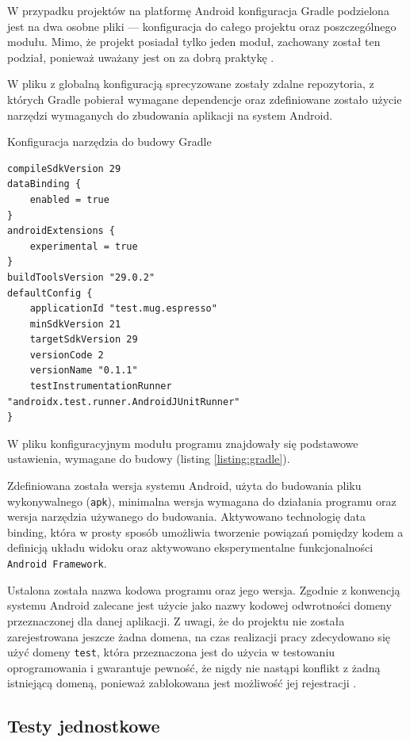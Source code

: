 \documentclass[polish,polish,a4paper,12pt]{article}
\begin{document}
	W przypadku projektów na platformę Android konfiguracja Gradle podzielona jest na dwa osobne pliki — konfiguracja do całego projektu oraz poszczególnego modułu. Mimo, że projekt posiadał tylko jeden moduł, zachowany został ten podział, ponieważ uważany jest on za dobrą praktykę \cite{kotlin}.

	W pliku z globalną konfiguracją sprecyzowane zostały zdalne repozytoria, z których Gradle pobierał wymagane dependencje oraz zdefiniowane zostało użycie narzędzi wymaganych do zbudowania aplikacji na system Android.

	\begin{listing}[H]
		\caption{Konfiguracja narzędzia do budowy Gradle}
		\begin{verbatim}
compileSdkVersion 29
dataBinding {
	enabled = true
}
androidExtensions {
	experimental = true
}
buildToolsVersion "29.0.2"
defaultConfig {
	applicationId "test.mug.espresso"
	minSdkVersion 21
	targetSdkVersion 29
	versionCode 2
	versionName "0.1.1"
	testInstrumentationRunner "androidx.test.runner.AndroidJUnitRunner"
}
		\end{verbatim}
		\label{listing:gradle}
	\end{listing}

	W pliku konfiguracyjnym modułu programu znajdowały się podstawowe ustawienia, wymagane do budowy (listing \ref{listing:gradle}).

	Zdefiniowana została wersja systemu Android, użyta do budowania pliku wykonywalnego (\texttt{apk}), minimalna wersja wymagana do działania programu oraz wersja narzędzia używanego do budowania. Aktywowano technologię data binding, która w prosty sposób umożliwia tworzenie powiązań pomiędzy kodem a definicją układu widoku oraz aktywowano eksperymentalne funkcjonalności \texttt{Android Framework}.

	Ustalona została nazwa kodowa programu oraz jego wersja. Zgodnie z konwencją systemu Android zalecane jest użycie jako nazwy kodowej odwrotności domeny przeznaczonej dla danej aplikacji. Z uwagi, że do projektu nie została zarejestrowana jeszcze żadna domena, na czas realizacji pracy zdecydowano się użyć domeny \texttt{test}, która przeznaczona jest do użycia w testowaniu oprogramowania i gwarantuje pewność, że nigdy nie nastąpi konflikt z żadną istniejącą domeną, ponieważ zablokowana jest możliwość jej rejestracji \cite{testdomainwiki}.

	\subsection{Testy jednostkowe}
\end{document}
